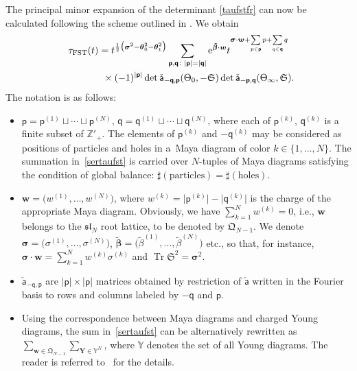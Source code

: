 \documentclass[pdftex]{sigma}
\newcommand{\bs}{\boldsymbol}
\numberwithin{equation}{section}
\begin{document}
The principal minor expansion of the determinant \eqref{taufstfr} can now be calculated following the scheme outlined in \cite[Section~2.2.1]{CGL}. We obtain
\begin{gather}
\tau_{\mathrm{FST}}(t)=t^{\frac12\big(\boldsymbol{\sigma}^2-\boldsymbol{\theta}_0^2-\boldsymbol{\theta}_t^2\big)}\sum_{\boldsymbol{\mathsf p},\boldsymbol{\mathsf q}\colon |\boldsymbol{\mathsf p}|=|\boldsymbol{\mathsf q}|}{\rm e}^{\boldsymbol{\tilde\beta}\cdot\boldsymbol{w}}t^{\boldsymbol{\sigma}\cdot\boldsymbol{w}+\sum\limits_{p\in\boldsymbol{\mathsf p}}p+\sum\limits_{q\in\boldsymbol{\mathsf q}}q}\nonumber \\
\hphantom{\tau_{\mathrm{FST}}(t)=}{} \times (-1)^{|\boldsymbol{\mathsf p}|} \det \check{\mathsf a}_{-\boldsymbol{\mathsf q},\boldsymbol{\mathsf p}}(\Theta_0,-\mathfrak S)
\det \check{\mathsf a}_{-\boldsymbol{\mathsf p},\boldsymbol{\mathsf q}}(\Theta_{\infty},\mathfrak S).\label{sertaufst}
\end{gather}
The notation is as follows:
\begin{itemize}\itemsep=0pt
\item $\boldsymbol{\mathsf p}=\mathsf p^{(1)}\sqcup\cdots\sqcup \mathsf p^{(N)}$, $\boldsymbol{\mathsf q}=\mathsf q^{(1)}\sqcup\cdots \sqcup\mathsf q^{(N)}$, where each of $\mathsf p^{(k)}$, $\mathsf q^{(k)}$ is a finite subset of $\mathbb Z'_+$. The elements of $\mathsf p^{(k)}$ and $-\mathsf q^{(k)}$ may be considered as positions of particles and holes in a~Maya diagram of color $k\in \{1,\ldots, N \}$. The summation in~\eqref{sertaufst} is carried over $N$-tuples of Maya diagrams satisfying the condition of global balance: $\sharp(\mathrm{particles})=\sharp(\mathrm{holes})$.
\item $\boldsymbol{w}=\big( w^{(1)},\ldots,w^{(N)}\big)$, where $w^{(k)}=\big|\mathsf p^{(k)}\big|-\big|\mathsf q^{(k)}\big|$ is the charge of the appropriate Maya diagram. Obviously, we have $\sum\limits_{k=1}^N w^{(k)}=0$, i.e., $\boldsymbol{w}$ belongs to the $\mathfrak{sl}_N$ root lattice, to be denoted by $\mathfrak Q_{N-1}$. We denote $\boldsymbol{\sigma}= \big(\sigma^{(1)},\ldots,\sigma^{(N)}\big)$, $\boldsymbol{\tilde\beta}=\big(\tilde\beta^{(1)},\ldots,\tilde\beta^{(N)}\big)$ etc., so that, for instance, $\boldsymbol{\sigma}\cdot\boldsymbol{w}=\sum\limits_{k=1}^N w^{(k)}\sigma^{(k)}$ and $\operatorname{Tr}\mathfrak S^2=\boldsymbol{\sigma}^2$.
\item $\check{\mathsf a}_{-\boldsymbol{\mathsf q},\boldsymbol{\mathsf p}}$ are $|\boldsymbol{\mathsf p}|\times |\boldsymbol{\mathsf p}|$ matrices obtained by restriction of $\check{\mathsf a}$ written in the Fourier basis to rows and columns labeled by $-\boldsymbol{\mathsf q}$ and $\boldsymbol{\mathsf p}$.
\item Using the correspondence between Maya diagrams and charged Young diagrams, the sum in~\eqref{sertaufst} can be alternatively rewritten as $\sum\limits_{\boldsymbol{w}\in\mathfrak Q_{N-1}}\sum\limits_{\bs Y\in\mathbb Y^N}$, where $\mathbb Y$ denotes the set of all Young diagrams. The reader is referred to~\cite{CGL,GL16,GL17} for the details.
\end{itemize}
\end{document}
